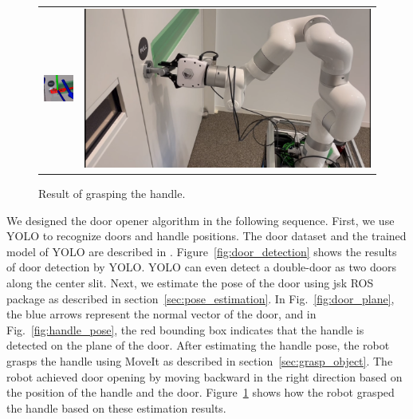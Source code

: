 \documentclass[runningheads,a4paper]{llncs}
\begin{document}
\begin{figure}[tbp]
\begin{tabular}{cc}
        \begin{minipage}[t]{0.45\hsize}
            \centering
            \includegraphics[width=0.4\linewidth]{images/handle_pose.png}
            \caption{Handle pose estimation.}
            \label{fig:handle_pose}
        \end{minipage} &
        \begin{minipage}[t]{0.45\hsize}
            \centering
            \includegraphics[width=0.8\linewidth]{images/grasp_door_handle.png}
            \caption{Result of grasping the handle.}
            \label{fig:grasp_handle}
        \end{minipage}
    \end{tabular}
\end{figure}
We designed the door opener algorithm in the following sequence. First, we use YOLO to recognize doors and handle positions.
The door dataset and the trained model of YOLO are described in \cite{Arduengo_2021}.
Figure~\ref{fig:door_detection} shows the results of door detection by YOLO.
YOLO can even detect a double-door as two doors along the center slit.
Next, we estimate the pose of the door using jsk ROS package as described in section~\ref{sec:pose_estimation}.
In Fig.~\ref{fig:door_plane}, the blue arrows represent the normal vector of the door, and in Fig.~\ref{fig:handle_pose}, the red bounding box indicates that the handle is detected on the plane of the door.
After estimating the handle pose, the robot grasps the handle using MoveIt as described in section~\ref{sec:grasp_object}.
The robot achieved door opening by moving backward in the right direction based on the position of the handle and the door.
Figure~\ref{fig:grasp_handle} shows how the robot grasped the handle based on these estimation results.
\end{document}
